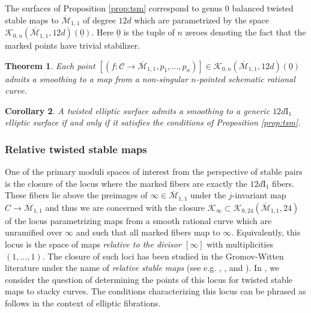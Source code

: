 \documentclass[11pt]{amsart}
\newtheorem{theorem}{Theorem}[section]
\newtheorem{cor}[theorem]{Corollary}
\theoremstyle{definition}
\theoremstyle{remark}
\newcommand{\calK}{\mathcal K}
\newcommand{\calM}{\mathcal M}
\newcommand{\calC}{\mathcal C}
\begin{document}
	The surfaces of Proposition \ref{prop:tsm} correspond to genus $0$ balanced twisted stable maps to $\overline{\calM}_{1,1}$ of degree $12d$ which are parametrized by the space $\calK_{0,n}(\overline{\calM}_{1,1}, 12d)(\underline{0})$. Here $\underline{0}$ is the tuple of $n$ zeroes denoting the fact that the marked points have trivial stabilizer. 
	
	\begin{theorem}\label{thm:tsm} \cite[Theorem 5.5]{tsm2} Each point $[(f : \calC \to \overline{\calM}_{1,1}, p_1, \ldots, p_{n})] \in \calK_{0,n}(\overline{\calM}_{1,1}, 12d)(\underline{0})$ admits a smoothing to a map from a non-singular $n$-pointed schematic rational curve. \end{theorem}
	
	\begin{cor}\label{cor:smoothing1} A twisted elliptic surface admits a smoothing to a generic $12d\mathrm{I}_1$ elliptic surface if and only if it satisfies the conditions of Proposition \ref{prop:tsm}. 
	\end{cor}
	
	\subsubsection{Relative twisted stable maps}
	
	One of the primary moduli spaces of interest from the perspective of stable pairs is the closure of the locus where the marked fibers are exactly the $12d\mathrm{I}_1$ fibers. These fibers lie above the preimages of $\infty \in \overline{\calM}_{1,1}$ under the $j$-invariant map $C \to \overline{\calM}_{1,1}$ and thus we are concerned with the closure $\calK_\infty \subset \calK_{0,24}(\overline{\calM}_{1,1},24)$ of the locus parametrizing maps from a smooth rational curve which are unramified over $\infty$ and such that all marked fibers map to $\infty$. Equivalently, this locus is the space of maps \emph{relative to the divisor $[\infty]$} with multiplicities $(1, \ldots, 1)$. The closure of such loci has been studied in the Gromov-Witten literature under the name of \emph{relative stable maps} (see e.g. \cite{vakil}, \cite{gathmann}, and \cite{cadman}). In \cite{tsm2}, we consider the question of determining the points of this locus for twisted stable maps to stacky curves. The conditions characterizing this locus \cite[Conditions $(\ast)$]{tsm2} can be phrased as follows in the context of elliptic fibrations. 
	
\end{document}
